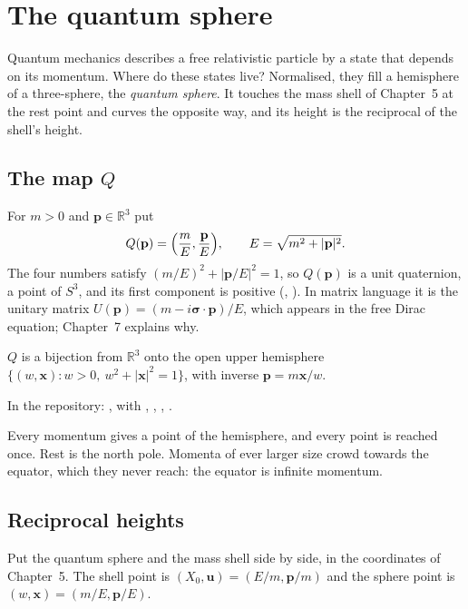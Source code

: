 \chapter{The quantum sphere}\label{ch:qsphere}

\begin{questionbox}
Quantum mechanics describes a free relativistic particle by a state that depends on its momentum. Where do these states live? Normalised, they fill a hemisphere of a three-sphere, the \emph{quantum sphere}. It touches the mass shell of Chapter~5 at the rest point and curves the opposite way, and its height is the reciprocal of the shell's height.
\end{questionbox}

\section{The map $Q$}

For $m>0$ and $\mathbf p\in\mathbb R^3$ put
\[
Q(\mathbf p)=\Bigl(\frac mE,\frac{\mathbf p}E\Bigr),\qquad E=\sqrt{m^2+|\mathbf p|^2}.
\]
The four numbers satisfy $(m/E)^2+|\mathbf p/E|^2=1$, so $Q(\mathbf p)$ is a unit quaternion, a point of $S^3$, and its first component is positive (, ). In matrix language it is the unitary matrix $U(\mathbf p)=(m-i\boldsymbol\sigma\cdot\mathbf p)/E$, which appears in the free Dirac equation; Chapter~7 explains why.

\begin{theorem}\proved\label{thm:qbij}
$Q$ is a bijection from $\mathbb R^3$ onto the open upper hemisphere $\{(w,\mathbf x):w>0,\ w^2+|\mathbf x|^2=1\}$, with inverse $\mathbf p=m\mathbf x/w$.
\end{theorem}
\noindent In the repository: , with , , , .

Every momentum gives a point of the hemisphere, and every point is reached once. Rest is the north pole. Momenta of ever larger size crowd towards the equator, which they never reach: the equator is infinite momentum.

\section{Reciprocal heights}

Put the quantum sphere and the mass shell side by side, in the coordinates of Chapter~5. The shell point is $(X_0,\mathbf u)=(E/m,\mathbf p/m)$ and the sphere point is $(w,\mathbf x)=(m/E,\mathbf p/E)$.

